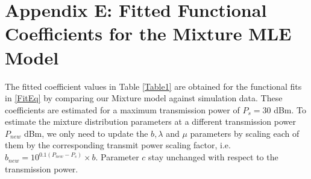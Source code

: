 \documentclass[12pt, draftclsnofoot, onecolumn]{IEEEtran}
\theoremstyle{plain}
\begin{document}
\section*{Appendix E: Fitted Functional Coefficients for the Mixture MLE Model}\label{ApxTables}\vspace{-.05in}
The fitted coefficient values in Table \ref{Table1} %
are obtained for the functional fits in \eqref{FitEq} by comparing our Mixture model against simulation data. These coefficients are estimated for a maximum transmission power of $P_s=30$ dBm. To estimate the mixture distribution parameters at a different transmission power $P_{new}$ dBm, we only need to update the $b, \lambda$ and $\mu$ parameters by scaling each of them by the corresponding transmit power scaling factor, i.e. $b_{new}=10^{0.1(P_{new}-P_s)} \times b$. Parameter $c$ stay unchanged with respect to the transmission power.
%
%
%
\end{document}
